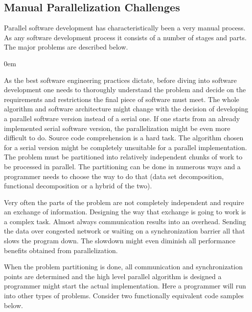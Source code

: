 \subsection{Manual Parallelization Challenges}
\label{background_challenges_manual}
\quad Parallel software development has characteristically been a very manual process. As any software development process it consists of a number of stages and parts. The major problems are described below.
\begin{description}[style=unboxed,leftmargin=0cm]
\itemsep0em
\item[Problem understanding and partitioning] As the best software engineering practices dictate, before diving into software development one needs to thoroughly understand the problem and decide on the requirements and restrictions the final piece of software must meet. The whole algorithm and software architecture might change with the decision of developing a parallel software version instead of a serial one. If one starts from an already implemented serial software version, the parallelization might be even more difficult to do. Source code comprehension is a hard task. The algorithm chosen for a serial version might be completely unsuitable for a parallel implementation. The problem must be partitioned into relatively independent chunks of work to be processed in parallel. The partitioning can be done in numerous ways and a programmer needs to choose the way to do that (data set decomposition, functional decomposition or a hybrid of the two).
\item[Communications and synchronization] Very often the parts of the problem are not completely independent and require an exchange of information. Designing the way that exchange is going to work is a complex task. Almost always communication results into an overhead. Sending the data over congested network or waiting on a synchronization barrier all that slows the program down. The slowdown might even diminish all performance benefits obtained from parallelization.
\item[Implementation and data dependencies] When the problem partitioning is done, all communication and synchronization points are determined and the high level parallel algorithm is designed a programmer might start the actual implementation. Here a programmer will run into other types of problems. Consider two functionally equivalent code samples below.\newline\null
\begin{minipage}[t]{0.50\linewidth}
\begin{lstlisting}[caption={Non-parallelizable loop with planted loop-carried data dependence.},label={lst:code_sample_data_dependence},language=C]

\end{lstlisting}
\end{minipage}
\end{description}
